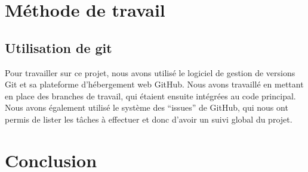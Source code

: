 \documentclass[12pt]{article}
\begin{document}
\newpage

\section{Méthode de travail}
\subsection{Utilisation de git}
Pour travailler sur ce projet, nous avons utilisé le logiciel de gestion de versions Git et sa plateforme d’hébergement web GitHub. Nous avons travaillé en mettant en place des branches de travail, qui étaient ensuite intégrées au code principal. Nous avons également utilisé le système des “issues” de GitHub, qui nous ont permis de lister les tâches à effectuer et donc d’avoir un suivi global du projet.

\section{Conclusion}
		
\end{document}
